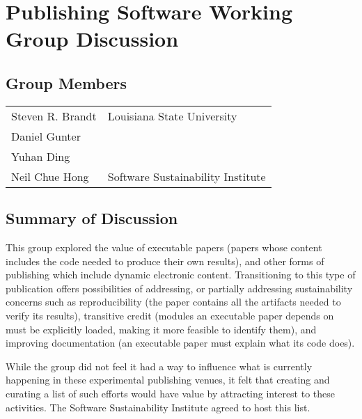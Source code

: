 \section{Publishing Software Working Group Discussion}
\label{sec:appendix_publishing_SW}

\subsection{Group Members}
{\small
\begin{longtable}{ll}
   Steven R. Brandt & Louisiana State University
\\ Daniel Gunter    & 
\\ Yuhan Ding       & 
\\ Neil Chue Hong   & Software Sustainability Institute
\end{longtable}
}

\subsection{Summary of Discussion}

This group explored the value of executable papers (papers whose content includes
the code needed to produce their own results), and other forms of publishing which
include dynamic electronic content. Transitioning to this type of publication offers
possibilities of addressing, or partially addressing sustainability concerns 
such as reproducibility (the paper contains all the artifacts needed to verify its
results), transitive credit (modules an executable paper depends on must be explicitly
loaded, making it more feasible to identify them), and improving documentation (an executable
paper must explain what its code does).

While the group did not feel it had a way to influence what is currently happening
in these experimental publishing venues, it felt that creating and curating a list of
such efforts would have value by attracting interest to these activities.
The Software Sustainability Institute agreed to host this list.

